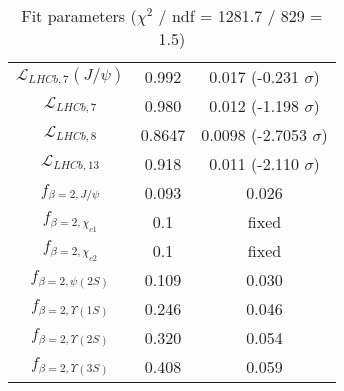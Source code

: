 \begin{table}[h!]
\begin{tabular}{c|c|c}
$\mathcal L_{LHCb,7}(J/\psi)$ & 0.992 & 0.017 (-0.231 $\sigma$) \\
$\mathcal L_{LHCb,7}$ & 0.980 & 0.012 (-1.198 $\sigma$) \\
$\mathcal L_{LHCb,8}$ & 0.8647 & 0.0098 (-2.7053 $\sigma$) \\
$\mathcal L_{LHCb,13}$ & 0.918 & 0.011 (-2.110 $\sigma$) \\
$f_{\beta=2,J/\psi}$ & 0.093 & 0.026 \\
$f_{\beta=2,\chi_{c1}}$ & 0.1 & fixed \\
$f_{\beta=2,\chi_{c2}}$ & 0.1 & fixed \\
$f_{\beta=2,\psi(2S)}$ & 0.109 & 0.030 \\
$f_{\beta=2,\Upsilon(1S)}$ & 0.246 & 0.046 \\
$f_{\beta=2,\Upsilon(2S)}$ & 0.320 & 0.054 \\
$f_{\beta=2,\Upsilon(3S)}$ & 0.408 & 0.059 \\
\end{tabular}
\caption{Fit parameters ($\chi^2$ / ndf = 1281.7 / 829 = 1.5)}
\end{table}
